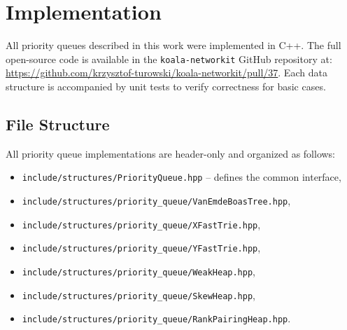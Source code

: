 \section{Implementation}

All priority queues described in this work were implemented in C++. The full open-source code is available in the \texttt{koala-networkit} GitHub repository at: \url{https://github.com/krzysztof-turowski/koala-networkit/pull/37}. Each data structure is accompanied by unit tests to verify correctness for basic cases.

\subsection{File Structure}

All priority queue implementations are header-only and organized as follows:

\begin{itemize}
  \item \texttt{include/structures/PriorityQueue.hpp} – defines the common interface,
  \item \texttt{include/structures/priority\_queue/VanEmdeBoasTree.hpp},
  \item \texttt{include/structures/priority\_queue/XFastTrie.hpp},
  \item \texttt{include/structures/priority\_queue/YFastTrie.hpp},
  \item \texttt{include/structures/priority\_queue/WeakHeap.hpp},
  \item \texttt{include/structures/priority\_queue/SkewHeap.hpp},
  \item \texttt{include/structures/priority\_queue/RankPairingHeap.hpp}.
\end{itemize}

